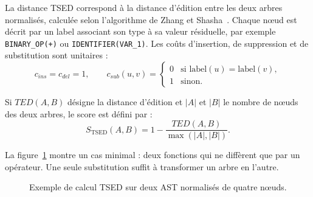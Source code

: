 {La distance TSED correspond à la distance d'édition entre les deux arbres
normalisés, calculée selon l'algorithme de Zhang et
Shasha~\cite{TODO_ref5,TODO_ref6}. Chaque nœud est décrit par un label
associant son type à sa valeur résiduelle, par exemple \texttt{BINARY\_OP(+)}
ou \texttt{IDENTIFIER(VAR\_1)}. Les coûts d'insertion, de suppression et de
substitution sont unitaires :
\begin{equation}
c_{ins} = c_{del} = 1, \qquad
c_{sub}(u,v) =
\begin{cases}
0 & \text{si } \mathrm{label}(u) = \mathrm{label}(v),\\
1 & \text{sinon.}
\end{cases}
\end{equation}

Si $TED(A,B)$ désigne la distance d'édition et $|A|$ et $|B|$ le nombre de
nœuds des deux arbres, le score est défini par :
\begin{equation}
S_{\mathrm{TSED}}(A,B) = 1 - \frac{TED(A,B)}{\max(|A|,|B|)}.
\end{equation}

La figure~\ref{fig:tsed} montre un cas minimal : deux fonctions qui ne
diffèrent que par un opérateur. Une seule substitution suffit à transformer un
arbre en l'autre.

\begin{figure}[htbp]
\centering
{}
\caption{Exemple de calcul TSED sur deux AST normalisés de quatre nœuds.}
\label{fig:tsed}
\end{figure}

}
